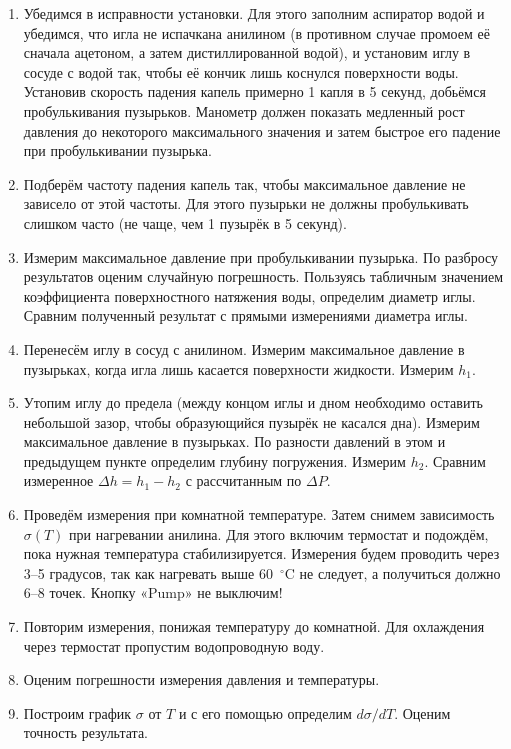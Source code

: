 \documentclass[a4paper,12pt]{article} %
\begin{document}
\begin{enumerate}
  \item Убедимся в исправности установки. Для этого заполним аспиратор водой и убедимся, что игла не испачкана анилином (в противном случае промоем её сначала ацетоном, а затем дистиллированной водой), и установим иглу в сосуде с водой так, чтобы её кончик лишь коснулся поверхности воды. Установив скорость падения капель примерно 1 капля в 5 секунд, добьёмся пробулькивания пузырьков. Манометр должен показать медленный рост давления до некоторого максимального значения и затем быстрое его падение при пробулькивании пузырька.
  
  \item Подберём частоту падения капель так, чтобы максимальное давление не зависело от этой частоты. Для этого пузырьки не должны пробулькивать слишком часто (не чаще, чем 1 пузырёк в 5 секунд).
  
  \item Измерим максимальное давление при пробулькивании пузырька. По разбросу результатов оценим случайную погрешность. Пользуясь табличным значением коэффициента поверхностного натяжения воды, определим диаметр иглы. Сравним полученный результат с прямыми измерениями диаметра иглы.
  
  \item Перенесём иглу в сосуд с анилином. Измерим максимальное давление в пузырьках, когда игла лишь касается поверхности жидкости. Измерим $h_1$.
  
  \item Утопим иглу до предела (между концом иглы и дном необходимо оставить небольшой зазор, чтобы образующийся пузырёк не касался дна). Измерим максимальное давление в пузырьках. По разности давлений в этом и предыдущем пункте определим глубину погружения. Измерим $h_2$. Сравним измеренное $\Delta h = h_1 - h_2$ с рассчитанным по $\Delta P$.
  
  \item Проведём измерения при комнатной температуре. Затем снимем зависимость $\sigma(T)$ при нагревании анилина. Для этого включим термостат и подождём, пока нужная температура стабилизируется. Измерения будем проводить через 3--5 градусов, так как нагревать выше 60~$^{\circ}$C не следует, а получиться должно 6--8 точек. Кнопку «Pump» не выключим!
  
  \item Повторим измерения, понижая температуру до комнатной. Для охлаждения через термостат пропустим водопроводную воду.
  
  \item Оценим погрешности измерения давления и температуры.
  
  \item Построим график $\sigma$ от $T$ и с его помощью определим $d\sigma/dT$. Оценим точность результата.
  
\end{enumerate}
\end{document}
